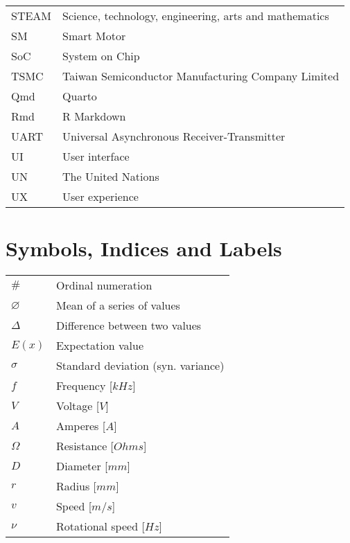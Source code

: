 {\begin{longtable}[h]{@{}p{} @{}p{}@{}}
STEAM           & Science, technology, engineering, arts and mathematics \\
SM              & Smart Motor \\
SoC             & System on Chip \\
TSMC            & Taiwan Semiconductor Manufacturing Company Limited \\
Qmd             & Quarto \\
Rmd             & R Markdown \\
UART            & Universal Asynchronous Receiver-Transmitter \\
UI              & User interface \\
UN              & The United Nations \\
UX              & User experience \\

\end{longtable}
}

\section*{Symbols, Indices and Labels}
{\renewcommand{\arraystretch}{1.1} \renewcommand{\tabcolsep}{0.2cm}
\begin{longtable}[h]{@{}p{} @{}p{}@{}}
$\#$            &Ordinal numeration\\
$\varnothing$   &Mean of a series of values\\
$\Delta$        &Difference between two values\\
$E(x)$          &Expectation value\\
$\sigma$        &Standard deviation (syn. variance)\vspace{13pt}\\
$f$             &Frequency [$kHz$]\\
$V$             &Voltage [$V$]\\    
$A$             &Amperes [$A$]\\
$\Omega$        &Resistance [$Ohms$]\\
$D$             &Diameter [$mm$]\\
$r$             &Radius [$mm$]\\
$v$             &Speed [$m/s$]\\
$\nu$           &Rotational speed [$Hz$]
\end{longtable}
}